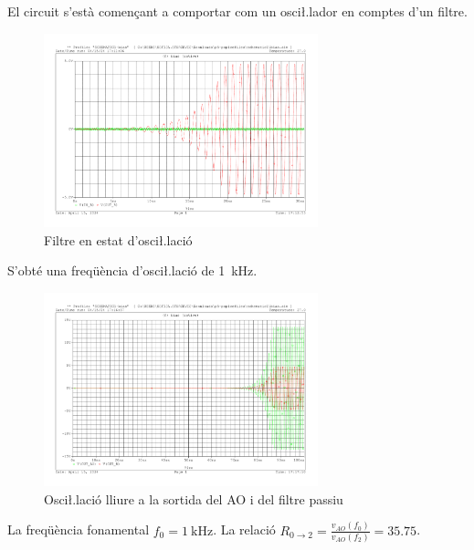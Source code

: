 \documentclass[catalan, a4paper, nobib]{tufte-handout}
\begin{document}
 El circuit s'està començant a comportar com un osci\l.lador en comptes d'un filtre.

\begin{figure}[!h]
    \begin{center}
        \includegraphics[width=300px]{5.1.pdf}
    \end{center}
    \caption{Filtre en estat d'osci\l.lació}
\end{figure}

 S'obté una freqüència d'osci\l.lació de \qty{1}{\kilo\hertz}.

\begin{figure}[!h]
    \begin{center}
        \includegraphics[width=300px]{5.2.pdf}
    \end{center}
    \caption{Osci\l.lació lliure a la sortida del AO i del filtre passiu}
\end{figure}

\newpage

 La freqüència fonamental $f_0 = \qty{1}{\kilo\hertz}$. La relació $R_{0\rightarrow2}=\frac{v_{AO}(f_0)}{v_{AO}(f_2)} = \num{35.75}$.
\end{document}
